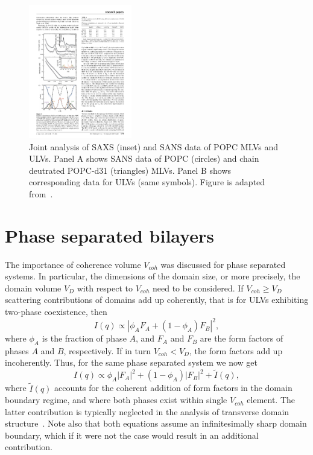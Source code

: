 \documentclass[8.5pt,twoside,twocolumn]{article}
\begin{document}
\begin{figure}[t]
	\centering
	\includegraphics[width=0.4\textwidth]{figures/SDP_MLV}
	\caption{Joint analysis of SAXS (inset) and SANS data of POPC MLVs and ULVs. Panel A shows SANS data of POPC (circles) and chain deutrated POPC-d31 (triangles) MLVs. Panel B shows corresponding data for ULVs (same symbols). Figure is adapted from~\cite{Heftberger.2014}.}
	\label{fig:SDP_MLV}
\end{figure}


\section{Phase separated bilayers}
\label{sec:phase_sep}

The importance of coherence volume $V_{coh}$ was discussed for phase separated systems. In particular, the dimensions of the domain size, or more precisely, the domain volume $V_D$ with respect to $V_{coh}$ need to be considered. If $V_{coh} \ge V_D$ scattering contributions of domains add up coherently, that is for ULVs exhibiting two-phase coexistence, then
\begin{equation}
	I(q) \propto | \phi_A F_A + (1-\phi_A) F_B|^2,
\end{equation}
where $\phi_A$ is the fraction of phase $A$, and $F_A$ and $F_B$ are the form factors of phases $A$ and $B$, respectively. If in turn $V_{coh} < V_D$, the form factors add up incoherently. Thus, for the same phase separated system we now get
\begin{equation}
I(q) \propto \phi_A |F_A|^2 + (1-\phi_A) |F_B|^2 + \tilde{I}(q),
\end{equation}
where $\tilde{I}(q)$ accounts for the coherent addition of form factors in the domain boundary regime, and where both phases exist within single $V_{coh}$ element. The latter contribution is typically neglected in the analysis of transverse domain structure~\cite{Heftberger.2015}. Note also that both equations assume an infinitesimally sharp domain boundary, which if it were not the case would result in an additional contribution.
\end{document}

